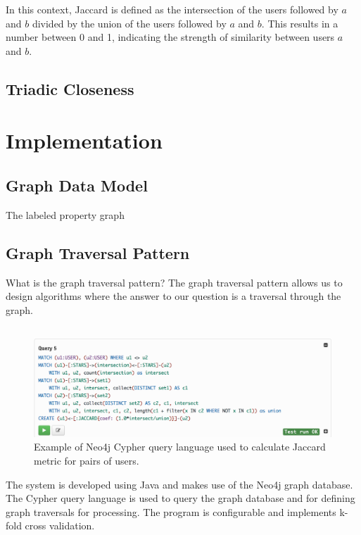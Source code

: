 In this context, Jaccard is defined as the intersection of the users followed by $a$ and $b$ divided by the union of the users followed by $a$ and $b$. This results in a number between 0 and 1, indicating the strength of similarity between users $a$ and $b$.
 
%
%   
%  

\subsection{Triadic Closeness}

\section{Implementation}

\subsection{Graph Data Model}
The labeled property graph

\subsection{Graph Traversal Pattern}
What is the graph traversal pattern? The graph traversal pattern allows us to design algorithms where the answer to our question is a traversal through the graph. 

\subsection{}
\begin{figure}[ht]
\vskip 0.2in
\begin{center}
\centerline{\includegraphics[width=\columnwidth]{images/jaccard.png}}
\caption{Example of Neo4j Cypher query language used to calculate Jaccard metric for pairs of users.}
\label{icml-historical}
\end{center}
\vskip -0.2in
\end{figure} 
The system is developed using Java and makes use of the Neo4j graph database. The Cypher query language is used to query the graph database and for defining graph traversals for processing. The program is configurable and implements k-fold cross validation.

